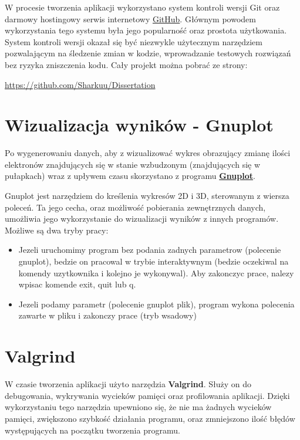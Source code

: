 W procesie tworzenia aplikacji wykorzystano system kontroli wersji Git oraz darmowy hostingowy serwis internetowy \href{https://github.com/}{GitHub}.
Głównym powodem wykorzystania tego systemu była jego popularność oraz prostota użytkowania.
System kontroli wersji okazał się być niezwykle użytecznym narzędziem pozwalającym na
śledzenie zmian w kodzie, wprowadzanie testowych rozwiązań bez
ryzyka zniszczenia kodu. Cały projekt można pobrać ze strony:
\begin{center}
\url{https://github.com/Sharkuu/Dissertation}
\end{center}

\section{Wizualizacja wyników - Gnuplot}

Po wygenerowaniu danych, aby z wizualizować wykres obrazujący zmianę ilości elektronów znajdujących się w stanie wzbudzonym (znajdujących się w pułapkach) wraz z upływem czasu skorzystano z programu \href{http://www.gnuplot.info/}{\textbf{Gnuplot}}.

Gnuplot jest narzędziem do kreślenia wykresów 2D i 3D, sterowanym z wiersza poleceń. Ta jego cecha, oraz możliwość pobierania zewnętrznych danych, umożliwia jego wykorzystanie do wizualizacji wyników z innych programów. Możliwe są dwa tryby pracy:
\begin{itemize}
\item Jezeli uruchomimy program bez podania zadnych parametrow (polecenie gnuplot), bedzie on pracowal w trybie interaktywnym (bedzie oczekiwal na komendy uzytkownika i kolejno je wykonywal). Aby zakonczyc prace, nalezy wpisac komende exit, quit lub q.
\item Jezeli podamy parametr (polecenie gnuplot plik), program wykona polecenia zawarte w pliku i zakonczy prace (tryb wsadowy)
\end{itemize}

\section{Valgrind}
W czasie tworzenia aplikacji użyto narzędzia \textbf{Valgrind}. Służy on do debugowania, wykrywania wycieków pamięci oraz profilowania aplikacji. Dzięki wykorzystaniu tego narzędzia upewniono się, że nie ma żadnych wycieków pamięci, zwiększono szybkość działania programu, oraz zmniejszono ilość błędów występujących na początku tworzenia programu.
